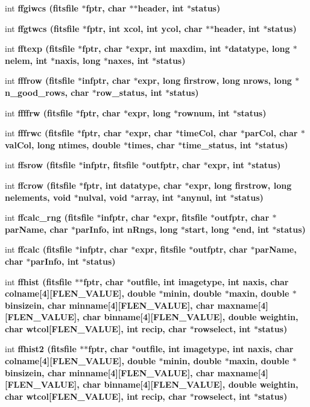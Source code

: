 \begin{CompactItemize}
\item 
int \bf{ffgiwcs} (\bf{fitsfile} $\ast$fptr, char $\ast$$\ast$header, int $\ast$status)
\item 
int \bf{ffgtwcs} (\bf{fitsfile} $\ast$fptr, int xcol, int ycol, char $\ast$$\ast$header, int $\ast$status)
\item 
int \bf{fftexp} (\bf{fitsfile} $\ast$fptr, char $\ast$expr, int maxdim, int $\ast$\bf{datatype}, long $\ast$nelem, int $\ast$naxis, long $\ast$naxes, int $\ast$status)
\item 
int \bf{fffrow} (\bf{fitsfile} $\ast$infptr, char $\ast$expr, long firstrow, long nrows, long $\ast$n\_\-good\_\-rows, char $\ast$row\_\-status, int $\ast$status)
\item 
int \bf{ffffrw} (\bf{fitsfile} $\ast$fptr, char $\ast$expr, long $\ast$rownum, int $\ast$status)
\item 
int \bf{fffrwc} (\bf{fitsfile} $\ast$fptr, char $\ast$expr, char $\ast$time\-Col, char $\ast$par\-Col, char $\ast$val\-Col, long ntimes, double $\ast$times, char $\ast$time\_\-status, int $\ast$status)
\item 
int \bf{ffsrow} (\bf{fitsfile} $\ast$infptr, \bf{fitsfile} $\ast$outfptr, char $\ast$expr, int $\ast$status)
\item 
int \bf{ffcrow} (\bf{fitsfile} $\ast$fptr, int \bf{datatype}, char $\ast$expr, long firstrow, long nelements, void $\ast$nulval, void $\ast$array, int $\ast$anynul, int $\ast$status)
\item 
int \bf{ffcalc\_\-rng} (\bf{fitsfile} $\ast$infptr, char $\ast$expr, \bf{fitsfile} $\ast$outfptr, char $\ast$par\-Name, char $\ast$par\-Info, int n\-Rngs, long $\ast$start, long $\ast$end, int $\ast$status)
\item 
int \bf{ffcalc} (\bf{fitsfile} $\ast$infptr, char $\ast$expr, \bf{fitsfile} $\ast$outfptr, char $\ast$par\-Name, char $\ast$par\-Info, int $\ast$status)
\item 
int \bf{ffhist} (\bf{fitsfile} $\ast$$\ast$fptr, char $\ast$outfile, int imagetype, int naxis, char colname[4][FLEN\_\-VALUE], double $\ast$minin, double $\ast$maxin, double $\ast$binsizein, char minname[4][FLEN\_\-VALUE], char maxname[4][FLEN\_\-VALUE], char binname[4][FLEN\_\-VALUE], double weightin, char wtcol[FLEN\_\-VALUE], int recip, char $\ast$rowselect, int $\ast$status)
\item 
int \bf{ffhist2} (\bf{fitsfile} $\ast$$\ast$fptr, char $\ast$outfile, int imagetype, int naxis, char colname[4][FLEN\_\-VALUE], double $\ast$minin, double $\ast$maxin, double $\ast$binsizein, char minname[4][FLEN\_\-VALUE], char maxname[4][FLEN\_\-VALUE], char binname[4][FLEN\_\-VALUE], double weightin, char wtcol[FLEN\_\-VALUE], int recip, char $\ast$rowselect, int $\ast$status)

\end{CompactItemize}

